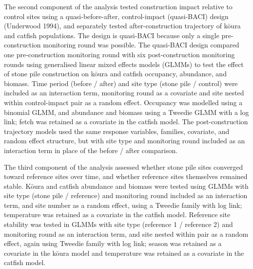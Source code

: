 \documentclass[
  12pt,
  a4paper,
  oneside]{scrbook}
\begin{document}
The second component of the analysis tested construction impact relative
to control sites using a quasi-before-after, control-impact (quasi-BACI)
design (Underwood 1994), and separately tested after-construction
trajectory of kōura and catfish populations. The design is quasi-BACI
because only a single pre-construction monitoring round was possible.
The quasi-BACI design compared one pre-construction monitoring round
with six post-construction monitoring rounds using generalised linear
mixed effects models (GLMMs) to test the effect of stone pile
construction on kōura and catfish occupancy, abundance, and biomass.
Time period (before / after) and site type (stone pile / control) were
included as an interaction term, monitoring round as a covariate and
site nested within control-impact pair as a random effect. Occupancy was
modelled using a binomial GLMM, and abundance and biomass using a
Tweedie GLMM with a log link; fetch was retained as a covariate in the
catfish model. The post-construction trajectory models used the same
response variables, families, covariate, and random effect structure,
but with site type and monitoring round included as an interaction term
in place of the before / after comparison.

The third component of the analysis assessed whether stone pile sites
converged toward reference sites over time, and whether reference sites
themselves remained stable. Kōura and catfish abundance and biomass were
tested using GLMMs with site type (stone pile / reference) and
monitoring round included as an interaction term, and site number as a
random effect, using a Tweedie family with log link; temperature was
retained as a covariate in the catfish model. Reference site stability
was tested in GLMMs with site type (reference 1 / reference 2) and
monitoring round as an interaction term, and site nested within pair as
a random effect, again using Tweedie family with log link; season was
retained as a covariate in the kōura model and temperature was retained
as a covariate in the catfish model.
\end{document}
